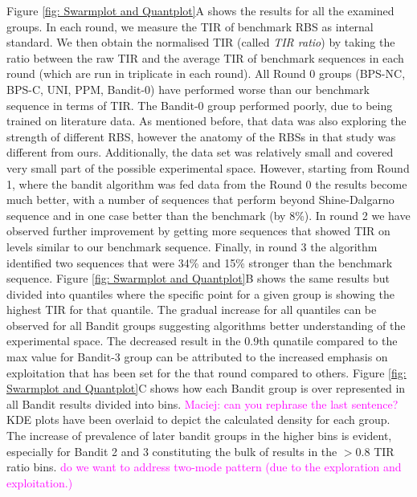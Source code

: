 \documentclass{article}
\newcommand{\mengyan}[1]{\textcolor{magenta}{#1}}
\begin{document}
Figure \ref{fig: Swarmplot and Quantplot}A shows the results for all the examined groups. 
In each round, we measure the TIR of benchmark RBS as internal standard. 
We then obtain the normalised TIR (called \textit{TIR ratio}) by taking the ratio between the raw TIR and the average TIR of benchmark sequences in each round (which are run in triplicate in each round).
All Round 0 groups (BPS-NC, BPS-C, UNI, PPM, Bandit-0) have performed worse than our benchmark sequence in terms of TIR. 
The Bandit-0 group performed poorly, due to being trained on literature data.
As mentioned before, that data was also exploring the strength of different RBS, however the anatomy of the RBSs in that study was different from ours.
Additionally, the data set was relatively small and covered very small part of the possible experimental space.
However, starting from Round 1, where the bandit algorithm was fed data from the Round 0 the results become much better, with a number of sequences that perform beyond Shine-Dalgarno sequence and in one case better than the benchmark (by 8\%).
In round 2 we have observed further improvement by getting more sequences that showed TIR on levels similar to our benchmark sequence.
Finally, in round 3 the algorithm identified two sequences that were 34\% and 15\% stronger than the benchmark sequence.
Figure \ref{fig: Swarmplot and Quantplot}B shows the same results but divided into quantiles where the specific point for a given group is showing the highest TIR for that quantile.
The gradual increase for all quantiles can be observed for all Bandit groups suggesting algorithms better understanding of the experimental space.
The decreased result in the 0.9th qunatile compared to the max value for Bandit-3 group can be attributed to the increased emphasis on exploitation that has been set for the that round compared to others.
Figure \ref{fig: Swarmplot and Quantplot}C shows how each Bandit group is over represented in all Bandit results divided into bins. 
\mengyan{Maciej: can you rephrase the last sentence?}
KDE plots have been overlaid to depict the calculated density for each group.
The increase of prevalence of later bandit groups in the higher bins is evident, especially for Bandit 2 and 3 constituting the bulk of results in the $>0.8$ TIR ratio bins.
\mengyan{do we want to address two-mode pattern (due to the exploration and exploitation.)}
\end{document}
